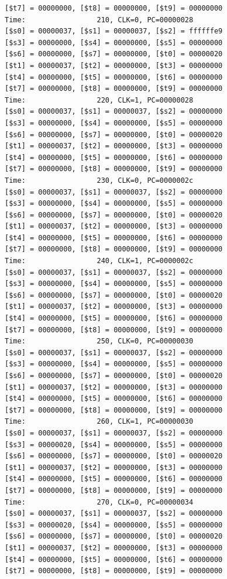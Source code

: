 \documentclass[a4paper,12pt]{article}
\begin{document}
\begin{lstlisting}
[$t7] = 00000000, [$t8] = 00000000, [$t9] = 00000000
Time:                 210, CLK=0, PC=00000028
[$s0] = 00000037, [$s1] = 00000037, [$s2] = ffffffe9
[$s3] = 00000000, [$s4] = 00000000, [$s5] = 00000000
[$s6] = 00000000, [$s7] = 00000000, [$t0] = 00000020
[$t1] = 00000037, [$t2] = 00000000, [$t3] = 00000000
[$t4] = 00000000, [$t5] = 00000000, [$t6] = 00000000
[$t7] = 00000000, [$t8] = 00000000, [$t9] = 00000000
Time:                 220, CLK=1, PC=00000028
[$s0] = 00000037, [$s1] = 00000037, [$s2] = 00000000
[$s3] = 00000000, [$s4] = 00000000, [$s5] = 00000000
[$s6] = 00000000, [$s7] = 00000000, [$t0] = 00000020
[$t1] = 00000037, [$t2] = 00000000, [$t3] = 00000000
[$t4] = 00000000, [$t5] = 00000000, [$t6] = 00000000
[$t7] = 00000000, [$t8] = 00000000, [$t9] = 00000000
Time:                 230, CLK=0, PC=0000002c
[$s0] = 00000037, [$s1] = 00000037, [$s2] = 00000000
[$s3] = 00000000, [$s4] = 00000000, [$s5] = 00000000
[$s6] = 00000000, [$s7] = 00000000, [$t0] = 00000020
[$t1] = 00000037, [$t2] = 00000000, [$t3] = 00000000
[$t4] = 00000000, [$t5] = 00000000, [$t6] = 00000000
[$t7] = 00000000, [$t8] = 00000000, [$t9] = 00000000
Time:                 240, CLK=1, PC=0000002c
[$s0] = 00000037, [$s1] = 00000037, [$s2] = 00000000
[$s3] = 00000000, [$s4] = 00000000, [$s5] = 00000000
[$s6] = 00000000, [$s7] = 00000000, [$t0] = 00000020
[$t1] = 00000037, [$t2] = 00000000, [$t3] = 00000000
[$t4] = 00000000, [$t5] = 00000000, [$t6] = 00000000
[$t7] = 00000000, [$t8] = 00000000, [$t9] = 00000000
Time:                 250, CLK=0, PC=00000030
[$s0] = 00000037, [$s1] = 00000037, [$s2] = 00000000
[$s3] = 00000000, [$s4] = 00000000, [$s5] = 00000000
[$s6] = 00000000, [$s7] = 00000000, [$t0] = 00000020
[$t1] = 00000037, [$t2] = 00000000, [$t3] = 00000000
[$t4] = 00000000, [$t5] = 00000000, [$t6] = 00000000
[$t7] = 00000000, [$t8] = 00000000, [$t9] = 00000000
Time:                 260, CLK=1, PC=00000030
[$s0] = 00000037, [$s1] = 00000037, [$s2] = 00000000
[$s3] = 00000020, [$s4] = 00000000, [$s5] = 00000000
[$s6] = 00000000, [$s7] = 00000000, [$t0] = 00000020
[$t1] = 00000037, [$t2] = 00000000, [$t3] = 00000000
[$t4] = 00000000, [$t5] = 00000000, [$t6] = 00000000
[$t7] = 00000000, [$t8] = 00000000, [$t9] = 00000000
Time:                 270, CLK=0, PC=00000034
[$s0] = 00000037, [$s1] = 00000037, [$s2] = 00000000
[$s3] = 00000020, [$s4] = 00000000, [$s5] = 00000000
[$s6] = 00000000, [$s7] = 00000000, [$t0] = 00000020
[$t1] = 00000037, [$t2] = 00000000, [$t3] = 00000000
[$t4] = 00000000, [$t5] = 00000000, [$t6] = 00000000
[$t7] = 00000000, [$t8] = 00000000, [$t9] = 00000000

\end{lstlisting}
\end{document}
